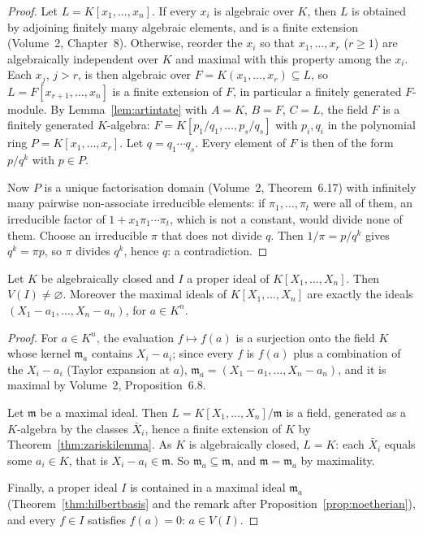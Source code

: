 \begin{proof}
Let $L=K[x_1,\dots,x_n]$. If every $x_i$ is algebraic over $K$, then $L$ is obtained by adjoining finitely many algebraic elements, and is a finite extension (Volume~2, Chapter~8). Otherwise, reorder the $x_i$ so that
$x_1,\dots,x_r$ ($r\ge1$) are algebraically independent over $K$ and maximal with this property among the $x_i$. Each $x_j$, $j>r$, is then algebraic over $F=K(x_1,\dots,x_r)\subseteq L$, so $L=F[x_{r+1},\dots,x_n]$ is a finite extension
of $F$, in particular a finitely generated $F$-module. By Lemma~\ref{lem:artintate} with $A=K$, $B=F$, $C=L$, the field $F$ is a finitely generated $K$-algebra: $F=K[p_1/q_1,\dots,p_s/q_s]$ with $p_i,q_i$ in the polynomial ring
$P=K[x_1,\dots,x_r]$. Let $q=q_1\cdots q_s$. Every element of $F$ is then of the form $p/q^k$ with $p\in P$.

Now $P$ is a unique factorisation domain (Volume~2, Theorem~6.17) with infinitely many pairwise non-associate irreducible elements: if $\pi_1,\dots,\pi_t$ were all of them, an irreducible factor of $1+x_1\pi_1\cdots\pi_t$,
which is not a constant, would divide none of them. Choose an irreducible $\pi$ that does not divide $q$. Then $1/\pi=p/q^k$ gives $q^k=\pi p$, so $\pi$ divides $q^k$, hence $q$: a contradiction.
\end{proof}

\begin{theorem}\label{thm:weaknull}
Let $K$ be algebraically closed and $I$ a proper ideal of $K[X_1,\dots,X_n]$. Then $V(I)\ne\varnothing$. Moreover the maximal ideals of $K[X_1,\dots,X_n]$ are exactly the ideals $(X_1-a_1,\dots,X_n-a_n)$, for $a\in K^n$.
\end{theorem}

\begin{proof}
For $a\in K^n$, the evaluation $f\mapsto f(a)$ is a surjection onto the field $K$ whose kernel $\mathfrak m_a$ contains $X_i-a_i$; since every $f$ is $f(a)$ plus a combination of the $X_i-a_i$ (Taylor expansion at $a$),
$\mathfrak m_a=(X_1-a_1,\dots,X_n-a_n)$, and it is maximal by Volume~2, Proposition~6.8.

Let $\mathfrak m$ be a maximal ideal. Then $L=K[X_1,\dots,X_n]/\mathfrak m$ is a field, generated as a $K$-algebra by the classes $\bar X_i$, hence a finite extension of $K$ by Theorem~\ref{thm:zariskilemma}. As $K$ is algebraically closed,
$L=K$: each $\bar X_i$ equals some $a_i\in K$, that is $X_i-a_i\in\mathfrak m$. So $\mathfrak m_a\subseteq\mathfrak m$, and $\mathfrak m=\mathfrak m_a$ by maximality.

Finally, a proper ideal $I$ is contained in a maximal ideal $\mathfrak m_a$ (Theorem~\ref{thm:hilbertbasis} and the remark after Proposition~\ref{prop:noetherian}), and every $f\in I$ satisfies $f(a)=0$: $a\in V(I)$.
\end{proof}

